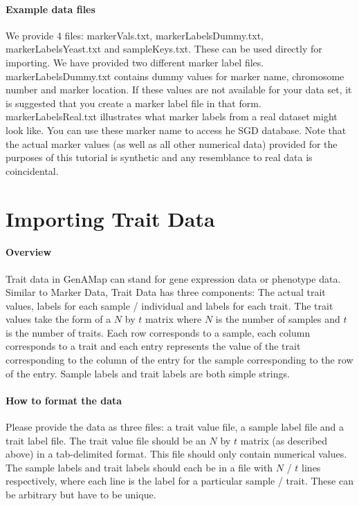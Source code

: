 \documentclass{article}
\begin{document}
\paragraph{Example data files} We provide 4 files: markerVals.txt, markerLabelsDummy.txt, markerLabelsYeast.txt and sampleKeys.txt. These can be used directly for importing. We have provided two different marker label files. markerLabelsDummy.txt contains dummy values for marker name, chromosome number and marker location. If these values are not available for your data set, it is suggested that you create a marker label file in that form. markerLabelsReal.txt illustrates what marker labels from a real dataset might look like. You can use these marker name to access he SGD database. Note that the actual marker values (as well as all other numerical data) provided for the purposes of this tutorial is synthetic and any resemblance to real data is coincidental.

\section{Importing Trait Data}

\paragraph{Overview} Trait data in GenAMap can stand for gene expression data or phenotype data. Similar to Marker Data, Trait Data has three components: The actual trait values, labels for each sample / individual and labels for each trait. The trait values take the form of a $N$ by $t$ matrix where $N$ is the number of samples and $t$ is the number of traits. Each row corresponds to a sample, each column corresponds to a trait and each entry represents the value of the trait corresponding to the column of the entry for the sample corresponding to the row of the entry. Sample labels and trait labels are both simple strings.

\paragraph{How to format the data} Please provide the data as three files: a trait value file, a sample label file and a trait label file. The trait value file should be an $N$ by $t$ matrix (as described above) in a tab-delimited format. This file should only contain numerical values. The sample labels and trait labels should each be in a file with $N$ / $t$ lines respectively, where each line is the label for a particular sample / trait. These can be arbitrary but have to be unique. \\
\end{document}
